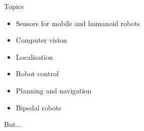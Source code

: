 \documentclass[compress]{beamer}
\begin{document}
\begin{frame}{Topics}

\begin{itemize}
\item Sensors for mobile and humanoid robots
\item Computer vision
\item Localisation
\item Robot control
\item Planning and navigation
\item Bipedal robots
\end{itemize}

\end{frame}


\begin{frame}[plain]{}
    But...
\end{frame}

\end{document}
